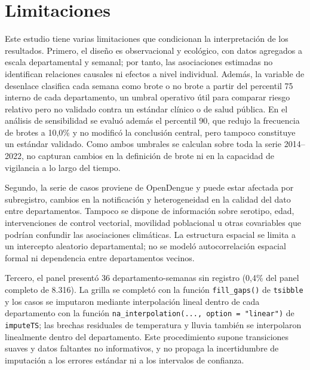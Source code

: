 \documentclass[11pt,a4paper]{article}
\begin{document}
\section{Limitaciones}

Este estudio tiene varias limitaciones que condicionan la interpretación de los resultados. Primero, el diseño es observacional y ecológico, con datos agregados a escala departamental y semanal; por tanto, las asociaciones estimadas no identifican relaciones causales ni efectos a nivel individual. Además, la variable de desenlace clasifica cada semana como brote o no brote a partir del percentil 75 interno de cada departamento, un umbral operativo útil para comparar riesgo relativo pero no validado contra un estándar clínico o de salud pública. En el análisis de sensibilidad se evaluó además el percentil 90, que redujo la frecuencia de brotes a 10,0\% y no modificó la conclusión central, pero tampoco constituye un estándar validado. Como ambos umbrales se calculan sobre toda la serie 2014--2022, no capturan cambios en la definición de brote ni en la capacidad de vigilancia a lo largo del tiempo.

\medskip

Segundo, la serie de casos proviene de OpenDengue y puede estar afectada por subregistro, cambios en la notificación y heterogeneidad en la calidad del dato entre departamentos. Tampoco se dispone de información sobre serotipo, edad, intervenciones de control vectorial, movilidad poblacional u otras covariables que podrían confundir las asociaciones climáticas. La estructura espacial se limita a un intercepto aleatorio departamental; no se modeló autocorrelación espacial formal ni dependencia entre departamentos vecinos.

\medskip

Tercero, el panel presentó 36 departamento-semanas sin registro (0,4\% del panel completo de 8.316). La grilla se completó con la función \texttt{fill\_gaps()} de \texttt{tsibble} y los casos se imputaron mediante interpolación lineal dentro de cada departamento con la función \texttt{na\_interpolation(..., option = "linear")} de \texttt{imputeTS}; las brechas residuales de temperatura y lluvia también se interpolaron linealmente dentro del departamento. Este procedimiento supone transiciones suaves y datos faltantes no informativos, y no propaga la incertidumbre de imputación a los errores estándar ni a los intervalos de confianza.

\medskip
\end{document}
